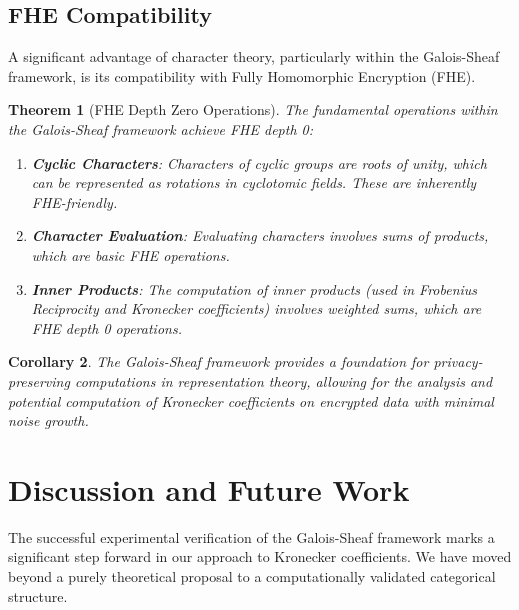 \documentclass[11pt]{article}
\newtheorem{theorem}{Theorem}[section]
\newtheorem{corollary}[theorem]{Corollary}
\theoremstyle{definition}
\theoremstyle{remark}
\begin{document}
\subsection{FHE Compatibility}
A significant advantage of character theory, particularly within the Galois-Sheaf framework, is its compatibility with Fully Homomorphic Encryption (FHE).
\begin{theorem}[FHE Depth Zero Operations]
The fundamental operations within the Galois-Sheaf framework achieve FHE depth 0:
\begin{enumerate}
    \item \textbf{Cyclic Characters}: Characters of cyclic groups are roots of unity, which can be represented as rotations in cyclotomic fields. These are inherently FHE-friendly.
    \item \textbf{Character Evaluation}: Evaluating characters involves sums of products, which are basic FHE operations.
    \item \textbf{Inner Products}: The computation of inner products (used in Frobenius Reciprocity and Kronecker coefficients) involves weighted sums, which are FHE depth 0 operations.
\end{enumerate}
\end{theorem}
\begin{corollary}
The Galois-Sheaf framework provides a foundation for privacy-preserving computations in representation theory, allowing for the analysis and potential computation of Kronecker coefficients on encrypted data with minimal noise growth.
\end{corollary}

\section{Discussion and Future Work}

The successful experimental verification of the Galois-Sheaf framework marks a significant step forward in our approach to Kronecker coefficients. We have moved beyond a purely theoretical proposal to a computationally validated categorical structure.
\end{document}
